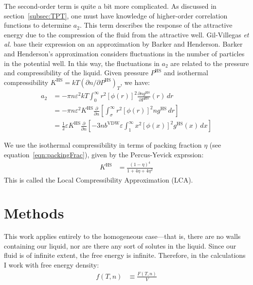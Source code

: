 \documentclass[letterpaper,twocolumn,amsmath,amssymb,prb]{revtex4-1}
\newcommand{\1}{\ensuremath{\textbf{r}_1}}
\newcommand{\2}{\ensuremath{\textbf{r}_2}}
\newcommand{\3}{\ensuremath{\textbf{r}_3}}
\newcommand{\4}{\ensuremath{\textbf{r}_4}}
\begin{document}
The second-order term is quite a bit more complicated. As discussed in
section~\ref{subsec:TPT}, one must have knowledge of higher-order
correlation functions to determine $a_2$. This term describes the
response of the attractive energy due to the compression of the fluid
from the attractive well. Gil-Villegas \emph{et al.} base their
expression on an approximation by Barker and Henderson.\cite{Barker67}
Barker and Henderson's approximation considers fluctuations in the
number of particles in the potential well. In this way, the
fluctuations in $a_2$ are related to the pressure and compressibility
of the liquid. Given pressure $P^\text{HS}$ and isothermal
compressibility $K^\text{HS} = kT\left(\partial n /\partial
P^\text{HS}\right)_T$, we have:
\begin{align}
  a_2 &= -\pi n \varepsilon^2kT\int_0^\infty r^2\left[\phi(r)\right]^2\frac{\partial n  g^\text{HS}}{\partial P^\text{HS}}(r)\,dr \nonumber \\
  &= -\pi n \varepsilon^2K^\text{HS}\frac{\partial}{\partial n }\left[\int_\sigma^\infty r^2\left[\phi(r)\right]^2 n  g^\text{HS}\,dr\right] \nonumber \\
  &= \frac{1}{2}\varepsilon K^\text{HS}\frac{\partial}{\partial n }\left[-3 n  b^\text{VDW}\varepsilon\int_1^\infty x^2\left[\phi(x)\right]^2 g^\text{HS}(x)\,dx \right]
\end{align}

We use the isothermal compressibility in terms of packing fraction
$\eta$ (see equation~\ref{eqn:packingFrac}), given by the Percus-Yevick exprssion:\cite{Barker76}
\begin{align}
  K^\text{HS} &= \frac{\left(1 - \eta\right)^4}{1 + 4\eta + 4\eta^2}
\end{align}
This is called the Local Compressibility Approximation (LCA).
\section{Methods}\label{sec:methods}

This work applies entirely to the homogeneous case---that is, there
are no walls containing our liquid, nor are there any sort of solutes
in the liquid. Since our fluid is of infinite extent, the free energy
is infinite. Therefore, in the calculations I work with free energy density:
\begin{align}
  f(T,n) &\equiv \frac{F(T,n)}{V}
\end{align}
\end{document}
